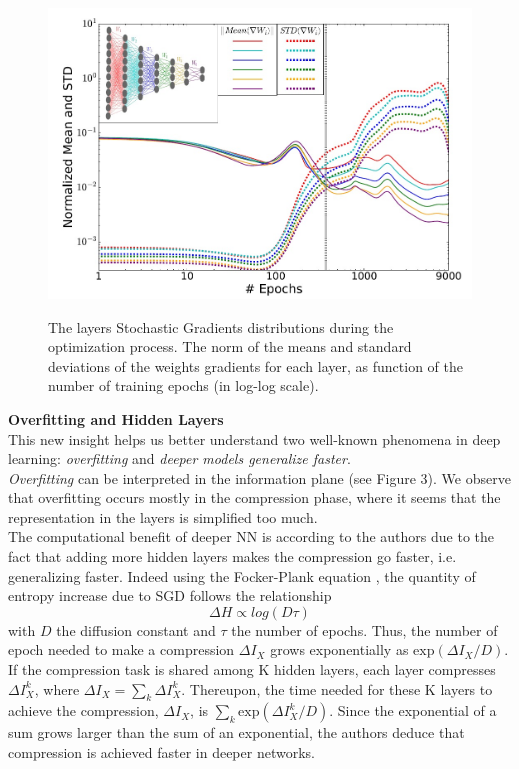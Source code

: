 \documentclass[twocolumn,superscriptaddress,aps]{revtex4-1}
\begin{document}
\begin{figure}[!htb]
\includegraphics[width=\linewidth, height=\textheight, keepaspectratio]{figs/gradients.jpeg}
\label{fig:sgd}
\caption{The layers Stochastic Gradients distributions during the optimization process. The norm of the means and standard deviations of the weights gradients for each layer, as function of the number of training epochs (in log-log scale). }
\end{figure}


\noindent \textbf{Overfitting and Hidden Layers} \\[0.15cm]
\indent This new insight helps us better understand two well-known phenomena in deep learning: \textit{overfitting} and \textit{deeper models generalize faster}. \\
\indent \textit{Overfitting} can be interpreted in the information plane (see Figure 3). We observe that overfitting occurs mostly in the compression phase, where it seems that the representation in the layers is simplified too much. \\

\indent The computational benefit of deeper NN is according to the authors due to the fact that adding more hidden layers makes the compression go faster, i.e. generalizing faster. Indeed using the Focker-Plank equation \cite{fokker}, the quantity of entropy increase due to SGD follows the relationship
\begin{equation}
\Delta H \propto log(D\tau)
\label{eq:propto}
\end{equation}
with $D$ the diffusion constant and $\tau$ the number of epochs. Thus, the number of epoch needed to make a compression $\Delta I_X$ grows exponentially as $\text{exp}(\Delta I_X / D)$. If the compression task is shared among K hidden layers, each layer compresses $\Delta I^k_X$, where $\Delta I_X = \sum_k \Delta I^k_X$. Thereupon, the time needed for these K layers to achieve the compression, $\Delta I_X$, is $\sum_k \text{exp}(\Delta I^k_X/D)$. Since the exponential of a sum grows larger than the sum of an exponential, the authors deduce that compression is achieved faster in deeper networks.
\end{document}
